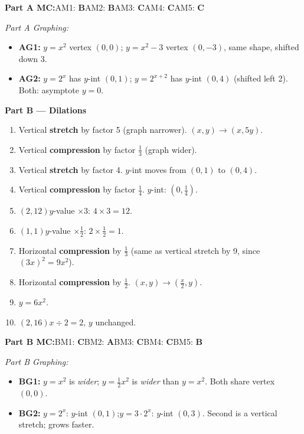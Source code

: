 \documentclass[12pt]{article}
\begin{document}
\noindent\textbf{Part A MC:}\quad AM1: \textbf{B}\quad AM2: \textbf{B}\quad AM3: \textbf{C}\quad AM4: \textbf{C}\quad AM5: \textbf{C}

\noindent\textit{Part A Graphing:}
\begin{itemize}[itemsep=2pt]
\item \textbf{AG1:} $y=x^2$ vertex $(0,0)$; $y=x^2-3$ vertex $(0,-3)$, same shape, shifted down 3.
\item \textbf{AG2:} $y=2^x$ has $y$-int $(0,1)$; $y=2^{x+2}$ has $y$-int $(0,4)$ (shifted left 2). Both: asymptote $y=0$.
\end{itemize}

\vspace{0.5em}
\begin{mdframed}[backgroundcolor=bluelight,linecolor=bluemain,linewidth=1.2pt,innerleftmargin=8pt]
{\large\textbf{Part B --- Dilations}}
\end{mdframed}
\begin{enumerate}[label=\textbf{B\arabic*.},leftmargin=*,itemsep=4pt]
\item Vertical \textbf{stretch} by factor 5 (graph narrower). $(x,y)\to(x,5y)$.
\item Vertical \textbf{compression} by factor $\tfrac{1}{3}$ (graph wider).
\item Vertical \textbf{stretch} by factor 4. $y$-int moves from $(0,1)$ to $(0,4)$.
\item Vertical \textbf{compression} by factor $\tfrac{1}{4}$. $y$-int: $(0,\tfrac{1}{4})$.
\item $(2,12)$\quad $y$-value $\times3$: $4\times3=12$.
\item $(1,1)$\quad $y$-value $\times\tfrac{1}{2}$: $2\times\tfrac{1}{2}=1$.
\item Horizontal \textbf{compression} by $\tfrac{1}{3}$ (same as vertical stretch by 9, since $(3x)^2=9x^2$).
\item Horizontal \textbf{compression} by $\tfrac{1}{2}$. $(x,y)\to(\tfrac{x}{2},y)$.
\item $y=6x^2$.
\item $(2,16)$\quad $x\div2=2$, $y$ unchanged.
\end{enumerate}

\noindent\textbf{Part B MC:}\quad BM1: \textbf{C}\quad BM2: \textbf{A}\quad BM3: \textbf{C}\quad BM4: \textbf{C}\quad BM5: \textbf{B}

\noindent\textit{Part B Graphing:}
\begin{itemize}[itemsep=2pt]
\item \textbf{BG1:} $y=x^2$ is \emph{wider}; $y=\tfrac{1}{2}x^2$ is \emph{wider} than $y=x^2$. Both share vertex $(0,0)$.
\item \textbf{BG2:} $y=2^x$: $y$-int $(0,1)$;\quad $y=3\cdot2^x$: $y$-int $(0,3)$. Second is a vertical stretch; grows faster.
\end{itemize}
\end{document}
